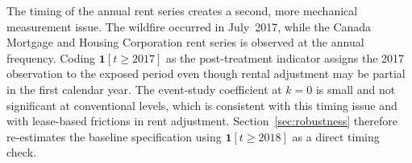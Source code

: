 \documentclass[12pt]{article}
\begin{document}
%
%
%
%
%
%

The timing of the annual rent series creates a second, more mechanical
measurement issue. The wildfire occurred in July~2017, while the Canada Mortgage and Housing Corporation rent
series is observed at the annual frequency. Coding $\mathbf{1}[t\geq 2017]$ as
the post-treatment indicator assigns the 2017 observation to the exposed period
even though rental adjustment may be partial in the first calendar year. The
event-study coefficient at $k=0$ is small and not significant at conventional
levels, which is consistent with this timing issue and with lease-based frictions
in rent adjustment. Section~\ref{sec:robustness} therefore re-estimates the
baseline specification using $\mathbf{1}[t\geq 2018]$ as a direct timing check.
\end{document}
